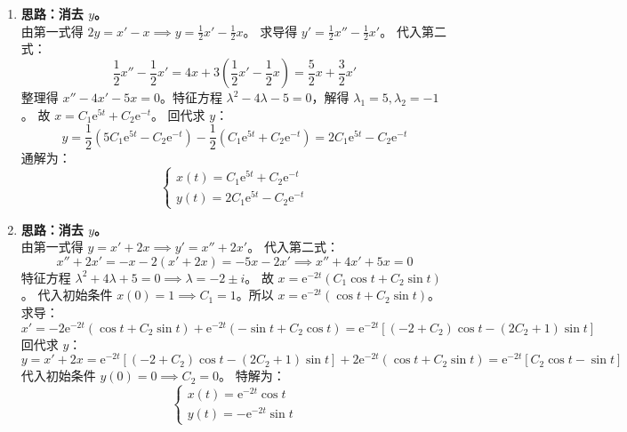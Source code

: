 \documentclass[lang=cn,11pt]{elegantbook}
\begin{document}
\begin{solution}
\begin{enumerate}
    \item[(1)] \textbf{思路：消去 $y$。}\\
    由第一式得 $2y = x' - x \implies y = \frac{1}{2}x' - \frac{1}{2}x$。
    求导得 $y' = \frac{1}{2}x'' - \frac{1}{2}x'$。
    代入第二式：
    \[
    \frac{1}{2}x'' - \frac{1}{2}x' = 4x + 3\left(\frac{1}{2}x' - \frac{1}{2}x\right) = \frac{5}{2}x + \frac{3}{2}x'
    \]
    整理得 $x'' - 4x' - 5x = 0$。特征方程 $\lambda^2 - 4\lambda - 5 = 0$，解得 $\lambda_1 = 5, \lambda_2 = -1$。
    故 $x = C_1\mathrm{e}^{5t} + C_2\mathrm{e}^{-t}$。
    回代求 $y$：
    \[
    y = \frac{1}{2}(5C_1\mathrm{e}^{5t} - C_2\mathrm{e}^{-t}) - \frac{1}{2}(C_1\mathrm{e}^{5t} + C_2\mathrm{e}^{-t}) = 2C_1\mathrm{e}^{5t} - C_2\mathrm{e}^{-t}
    \]
    通解为：
    \[
    \begin{cases}
    x(t) = C_1\mathrm{e}^{5t} + C_2\mathrm{e}^{-t} \\
    y(t) = 2C_1\mathrm{e}^{5t} - C_2\mathrm{e}^{-t}
    \end{cases}
    \]

    \item[(2)] \textbf{思路：消去 $y$。}\\
    由第一式得 $y = x' + 2x \implies y' = x'' + 2x'$。
    代入第二式：
    \[
    x'' + 2x' = -x - 2(x' + 2x) = -5x - 2x' \implies x'' + 4x' + 5x = 0
    \]
    特征方程 $\lambda^2 + 4\lambda + 5 = 0 \implies \lambda = -2 \pm i$。
    故 $x = \mathrm{e}^{-2t}(C_1\cos t + C_2\sin t)$。
    代入初始条件 $x(0) = 1 \implies C_1 = 1$。所以 $x = \mathrm{e}^{-2t}(\cos t + C_2\sin t)$。
    求导：
    \[
    x' = -2\mathrm{e}^{-2t}(\cos t + C_2\sin t) + \mathrm{e}^{-2t}(-\sin t + C_2\cos t) = \mathrm{e}^{-2t}[(-2+C_2)\cos t - (2C_2+1)\sin t]
    \]
    回代求 $y$：
    \[
    y = x' + 2x = \mathrm{e}^{-2t}[(-2+C_2)\cos t - (2C_2+1)\sin t] + 2\mathrm{e}^{-2t}(\cos t + C_2\sin t) = \mathrm{e}^{-2t}[C_2\cos t - \sin t]
    \]
    代入初始条件 $y(0) = 0 \implies C_2 = 0$。
    特解为：
    \[
    \begin{cases}
    x(t) = \mathrm{e}^{-2t}\cos t \\
    y(t) = -\mathrm{e}^{-2t}\sin t
    \end{cases}
    \]


\end{enumerate}
\end{solution}
\end{document}
